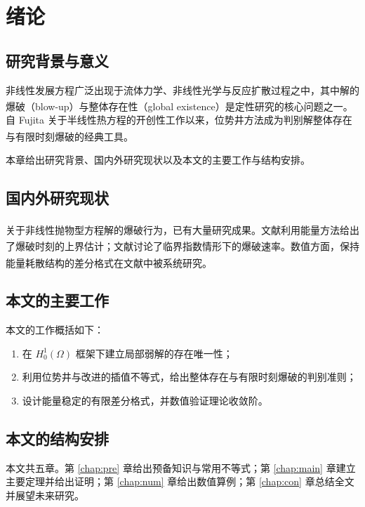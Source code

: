 \documentclass[12pt,a4paper,twoside,openright]{ctexbook}
\makeatletter
\newif\ifncwufront       %
\numberwithin{figure}{chapter}
\numberwithin{table}{chapter}
\numberwithin{equation}{chapter}
\theoremstyle{ncwuthm}
\newcommand{\upcite}[1]{\textsuperscript{\cite{#1}}}
\renewcommand{\cleardoublepage}{%
  \clearpage
  \if@twoside
    \ifodd\c@page\else
      \hbox{}\thispagestyle{empty}\newpage
    \fi
  \fi}
\makeatother
\begin{document}
\cleardoublepage

\cleardoublepage
\ncwufrontfalse
{}
\setcounter{page}{1}

\chapter{绪论}
\section{研究背景与意义}
非线性发展方程广泛出现于流体力学、非线性光学与反应扩散过程之中，其中解的爆破（blow-up）与整体存在性（global existence）是定性研究的核心问题之一\upcite{ref1,ref2}。自 Fujita 关于半线性热方程的开创性工作以来，位势井方法成为判别解整体存在与有限时刻爆破的经典工具\upcite{ref3}。

本章给出研究背景、国内外研究现状以及本文的主要工作与结构安排。

\section{国内外研究现状}
关于非线性抛物型方程解的爆破行为，已有大量研究成果。文献\upcite{ref4}利用能量方法给出了爆破时刻的上界估计；文献\upcite{ref5}讨论了临界指数情形下的爆破速率。数值方面，保持能量耗散结构的差分格式在文献\upcite{ref6}中被系统研究。

\section{本文的主要工作}
本文的工作概括如下：

\begin{enumerate}[label=(\arabic*)]
  \item 在 $H^1_0(\Omega)$ 框架下建立局部弱解的存在唯一性；
  \item 利用位势井与改进的插值不等式，给出整体存在与有限时刻爆破的判别准则；
  \item 设计能量稳定的有限差分格式，并数值验证理论收敛阶。
\end{enumerate}

\section{本文的结构安排}
本文共五章。第 \ref{chap:pre} 章给出预备知识与常用不等式；第 \ref{chap:main} 章建立主要定理并给出证明；第 \ref{chap:num} 章给出数值算例；第 \ref{chap:con} 章总结全文并展望未来研究。
\end{document}
